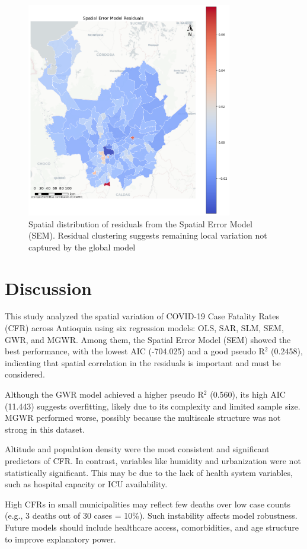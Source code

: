 \documentclass[a4paper,fleqn]{cas-sc}
\begin{document}
\begin{figure}[htbp]
  \centering
  \includegraphics[width=0.8\textwidth]{figures/figure10.png}
  \caption{Spatial distribution of residuals from the Spatial Error Model (SEM). Residual clustering suggests remaining local variation not captured by the global model}\label{fig:sem-residuals}
\end{figure}

\section*{Discussion}

This study analyzed the spatial variation of COVID-19 Case Fatality Rates (CFR) across Antioquia using six regression models: OLS, SAR, SLM, SEM, GWR, and MGWR. Among them, the Spatial Error Model (SEM) showed the best performance, with the lowest AIC (-704.025) and a good pseudo R$^2$ (0.2458), indicating that spatial correlation in the residuals is important and must be considered.

Although the GWR model achieved a higher pseudo R$^2$ (0.560), its high AIC (11.443) suggests overfitting, likely due to its complexity and limited sample size. MGWR performed worse, possibly because the multiscale structure was not strong in this dataset.

Altitude and population density were the most consistent and significant predictors of CFR. In contrast, variables like humidity and urbanization were not statistically significant. This may be due to the lack of health system variables, such as hospital capacity or ICU availability.

High CFRs in small municipalities may reflect few deaths over low case counts (e.g., 3 deaths out of 30 cases = 10\%). Such instability affects model robustness. Future models should include healthcare access, comorbidities, and age structure to improve explanatory power.


\printcredits


% 


\end{document}
